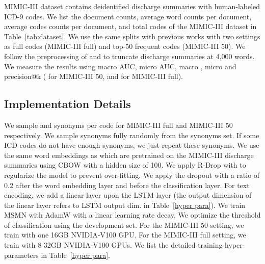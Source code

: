 \documentclass[11pt]{article}
\begin{document}
MIMIC-III dataset \cite{johnson2016mimic} contains deidentified discharge summaries with human-labeled ICD-9 codes.
We list the document counts, average word counts per document, average codes counts per document, and total codes of the MIMIC-III dataset in Table~\ref{tab:dataset}.
We use the same splits with previous works \cite{mullenbach-etal-2018-explainable,ijcai2020-461-vu}
with two settings as full codes (MIMIC-III full) and top-50 frequent codes (MIMIC-III 50).
We follow the preprocessing of \citet{xie2019ehr} and \citet{ijcai2020-461-vu} to truncate discharge summaries at 4,000 words.
We measure the results using macro AUC, micro AUC, macro , micro  and precision@k ( for MIMIC-III 50,  and  for MIMIC-III full).







\subsection{Implementation Details}



We sample  and  synonyms per code for MIMIC-III full and MIMIC-III 50 respectively.
We sample synonyms fully randomly from the synonyms set. If some ICD codes do not have enough synonyms, we just repeat these synonyms.
We use the same word embeddings as \citet{ijcai2020-461-vu} which are pretrained on the MIMIC-III discharge summaries using CBOW \cite{mikolov2013efficient} with a hidden size of 100.
We apply R-Drop with  \cite{liang2021rdrop} to regularize the model to prevent over-fitting. 
We apply the dropout with a ratio of 0.2 after the word embedding layer and before the classification layer.
For text encoding, we add a linear layer upon the LSTM layer (the output dimension of the linear layer refers to LSTM output dim. in Table~\ref{hyper para}).
We train MSMN with AdamW \cite{loshchilov2017decoupled} with a linear learning rate decay.
We optimize the threshold of classification using the development set.
For the MIMIC-III 50 setting, we train with one 16GB NVIDIA-V100 GPU.
For the MIMIC-III full setting, we train with 8 32GB NVIDIA-V100 GPUs.
We list the detailed training hyper-parameters in Table~\ref{hyper para}.
\end{document}
